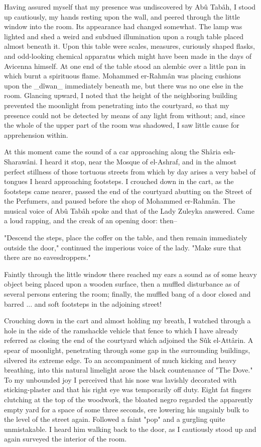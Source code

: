 Having assured myself that my presence was undiscovered by Abû Tabâh,
I stood up cautiously, my hands resting upon the wall, and peered
through the little window into the room. Its appearance had changed
somewhat. The lamp was lighted and shed a weird and subdued
illumination upon a rough table placed almost beneath it. Upon this
table were scales, measures, curiously shaped flasks, and odd-looking
chemical apparatus which might have been made in the days of Avicenna
himself. At one end of the table stood an alembic over a little pan in
which burnt a spirituous flame. Mohammed er-Rahmân was placing
cushions upon the _dîwan_ immediately beneath me, but there was no one
else in the room. Glancing upward, I noted that the height of the
neighboring building prevented the moonlight from penetrating into the
courtyard, so that my presence could not be detected by means of any
light from without; and, since the whole of the upper part of the room
was shadowed, I saw little cause for apprehension within.

At this moment came the sound of a car approaching along the Shâria
esh-Sharawâni. I heard it stop, near the Mosque of el-Ashraf, and in
the almost perfect stillness of those tortuous streets from which by
day arises a very babel of tongues I heard approaching footsteps. I
crouched down in the cart, as the footsteps came nearer, passed the
end of the courtyard abutting on the Street of the Perfumers, and
paused before the shop of Mohammed er-Rahmân. The musical voice of
Abû Tabâh spoke and that of the Lady Zuleyka answered. Came a loud
rapping, and the creak of an opening door: then--

"Descend the steps, place the coffer on the table, and then remain
immediately outside the door," continued the imperious voice of the
lady. "Make sure that there are no eavesdroppers."

Faintly through the little window there reached my ears a sound as of
some heavy object being placed upon a wooden surface, then a muffled
disturbance as of several persons entering the room; finally, the
muffled bang of a door closed and barred ... and soft footsteps in
the adjoining street!

Crouching down in the cart and almost holding my breath, I watched
through a hole in the side of the ramshackle vehicle that fence to
which I have already referred as closing the end of the courtyard
which adjoined the Sûk el-Attârin. A spear of moonlight, penetrating
through some gap in the surrounding buildings, silvered its extreme
edge. To an accompaniment of much kicking and heavy breathing, into
this natural limelight arose the black countenance of "The Dove."
To my unbounded joy I perceived that his nose was lavishly decorated
with sticking-plaster and that his right eye was temporarily off duty.
Eight fat fingers clutching at the top of the woodwork, the bloated
negro regarded the apparently empty yard for a space of some three
seconds, ere lowering his ungainly bulk to the level of the street
again. Followed a faint "pop" and a gurgling quite unmistakable. I
heard him walking back to the door, as I cautiously stood up and
again surveyed the interior of the room.


